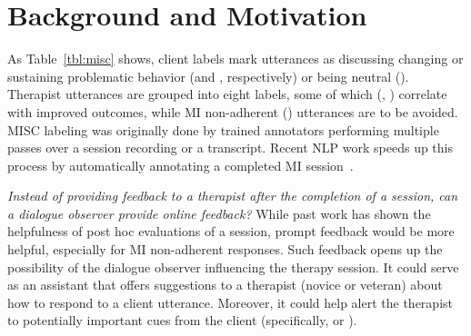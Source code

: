 \section{Background and Motivation}
\label{sec:snt:background}
As Table~\ref{tbl:misc} shows, client labels mark utterances as
discussing changing or sustaining problematic behavior (\CHANGE and
\SUSTAIN, respectively) or being neutral (\FN). Therapist utterances
are grouped into eight labels, some of which (\RES, \REC) correlate
with improved outcomes, while MI non-adherent (\MIN) utterances are to
be avoided.  MISC labeling was originally done by trained annotators
performing multiple passes over a session recording or a transcript.
Recent NLP work speeds up this process by automatically annotating a
completed MI session~\citep[\eg,][]{tanana2016comparison,
  xiao2016behavioral, perez2017predicting}.

\emph{Instead of providing feedback to a therapist after the
  completion of a session, can a dialogue observer provide online
  feedback?} While past work has shown the helpfulness of post hoc
evaluations of a session, prompt feedback would be more helpful,
especially for MI non-adherent responses.  Such feedback opens up
the possibility of the dialogue observer influencing the therapy
session. It could serve as an assistant that offers suggestions to a
therapist (novice or veteran) about how to respond to a client
utterance. Moreover, it could help alert the therapist to
potentially important cues from the client (specifically, \CHANGE or
\SUSTAIN). %




